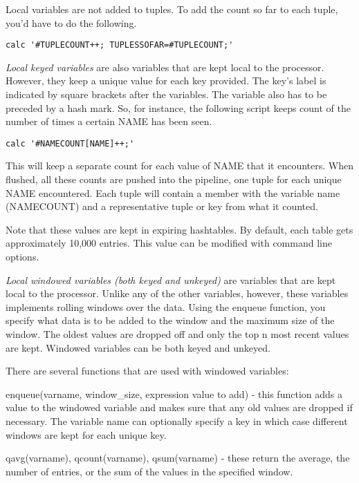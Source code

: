 \documentclass[11pt]{article}
\begin{document}
Local variables are not added to tuples.  To add the count
so far to each tuple, you'd have to do the following.

\begin{lstlisting}
calc '#TUPLECOUNT++; TUPLESSOFAR=#TUPLECOUNT;'
\end{lstlisting}

\emph{Local keyed variables} are also variables that are kept local to the processor.  However,
they keep a unique value for each key provided.  The key's label is indicated by square brackets
after the variables.  The variable also has to be preceded by a hash mark.  So, for instance, the
following script keeps count of the number of times a certain NAME has been seen.

\begin{lstlisting}
calc '#NAMECOUNT[NAME]++;'
\end{lstlisting}

This will keep a separate count for each value of NAME that it encounters.  When flushed, all
these counts are pushed into the pipeline, one tuple for each unique NAME encountered.  Each
tuple will contain a member with the variable name (NAMECOUNT) and  a representative tuple or key
from what it counted.  

Note that these values are kept in expiring hashtables.  By default, each table gets approximately
10,000 entries.  This value can be modified with command line options.

\emph{Local windowed variables (both keyed and unkeyed)} are variables that are kept local to the
processor.  Unlike any of the other variables, however, these variables implements rolling windows
over the data.  Using the enqueue function, you specify what data is to be added to the window and
the maximum size of the window.  The oldest values are dropped off and only the top n most recent
values are kept.  Windowed variables can be both keyed and unkeyed.

There are several functions that are used with windowed variables:

enqueue(varname, window\_size, expression value to add) - this function adds a value to the 
windowed variable and makes sure that any old values are dropped if necessary.  The variable
name can optionally specify a key in which case different windows are kept for each unique key.

qavg(varname), qcount(varname), qsum(varname) - these return the average, the number of entries, or
the sum of the values in the specified window.
\end{document}
